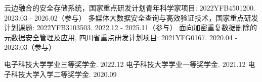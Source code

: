\documentclass[promaster]{thesis-uestc}
\begin{document}



\begin{thesistheaccomplish}
     云边融合的安全存储系统，国家重点研发计划青年科学家项目: 2022YFB4501200. 2023.03 - 2026.02（参与）
     多媒体大数据安全查询与高效验证技术，国家重点研发计划课题: 2022YFB3103503. 2022.12 - 2025.11（参与）
     面向加密重复数据删除的元数据安全管理及应用, 四川省重点研发计划项目: 2021YFG0167. 2020.04 - 2023.03（参与）

     电子科技大学学业三等奖学金. 2022.12
     电子科技大学学业一等奖学金. 2021.12
     电子科技大学入学二等奖学金. 2020.09
\end{thesistheaccomplish}


\end{document}
